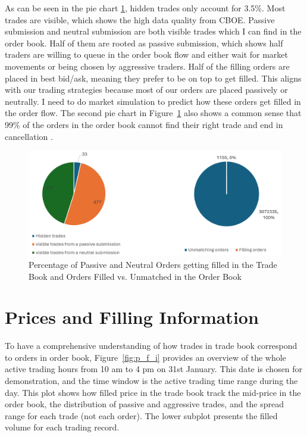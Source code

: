 As can be seen in the pie chart \ref{fig:p_of_AT_unma}, hidden trades only account for 3.5\%. Most trades are visible, which shows the high data quality from CBOE. Passive submission and neutral submission are both visible trades which I can find in the order book. Half of them are rooted as passive submission, which shows half traders are willing to queue in the order book flow and either wait for market movements or being chosen by aggressive traders. Half of the filling orders are placed in best bid/ask, meaning they prefer to be on top to get filled. This aligns with our trading strategies because most of our orders are placed passively or neutrally. I need to do market simulation to predict how these orders get filled in the order flow. The second pie chart in Figure~\ref{fig:p_of_AT_unma} also shows a common sense that 99\% of the orders in the order book cannot find their right trade and end in cancellation \citep{gould_limit_2013}.

\begin{figure}[h]
    \centering
    \includegraphics[width=0.8\linewidth]{figures/percentage_of_AT_unmatch.png}
    \caption{Percentage of Passive and Neutral Orders getting filled in the Trade Book and Orders Filled vs. Unmatched in the Order Book}
    \label{fig:p_of_AT_unma}
\end{figure}


\section{Prices and Filling Information} \label{sec:price}
To have a comprehensive understanding of how trades in trade book correspond to orders in order book, Figure~\ref{fig:p_f_i} provides an overview of the whole active trading hours from 10 am to 4 pm on 31st January. This date is chosen for demonstration, and the time window is the active trading time range during the day. This plot shows how filled price in the trade book track the mid-price in the order book, the distribution of passive and aggressive trades, and the spread range for each trade (not each order). The lower subplot presents the filled volume for each trading record.

